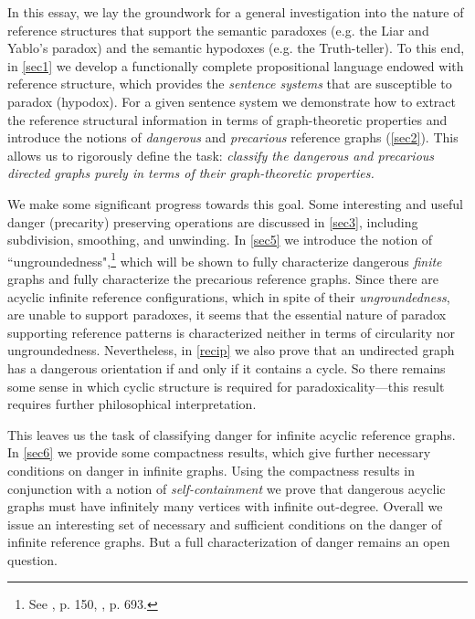 \documentclass[12pt]{kluwer}
\theoremstyle{remark}
\newcommand{\prg}{\hspace{0.25in}}
\begin{document}
\prg In this essay, we lay the groundwork for a general investigation into the nature of reference structures that support the semantic paradoxes (e.g. the Liar and Yablo's paradox) and the semantic hypodoxes (e.g. the Truth-teller). To this end, in \autoref{sec1} we develop a functionally complete propositional language endowed with reference structure, which provides the \textit{sentence systems} that are susceptible to paradox (hypodox). For a given sentence system we demonstrate how to extract the reference structural information in terms of graph-theoretic properties and introduce the notions of \textit{dangerous} and  \textit{precarious} reference graphs (\autoref{sec2}). This allows us to rigorously define the task: \textit{classify the dangerous and precarious directed graphs purely in terms of their graph-theoretic properties.} 

\prg We make some significant progress towards this goal. Some interesting and useful danger (precarity) preserving operations are discussed in \autoref{sec3}, including subdivision, smoothing, and unwinding. In \autoref{sec5} we introduce the notion of  ``ungroundedness",\footnote{See \cite{herzberger1970}, p. 150, \cite{kripke75}, p. 693.}  which will be shown to fully characterize dangerous \textit{finite} graphs and fully characterize the precarious reference graphs. Since there are acyclic infinite reference configurations, which in spite of their \textit{ungroundedness}, are unable to support paradoxes, it seems that the essential nature of paradox supporting reference patterns is characterized neither in terms of circularity nor ungroundedness. Nevertheless, in \autoref{recip} we also prove that an undirected graph has a dangerous orientation if and only if it contains a cycle. So there remains some sense in which cyclic structure is required for paradoxicality---this result requires further philosophical interpretation.

\prg This leaves us the task of classifying danger for infinite acyclic reference graphs. In \autoref{sec6} we provide some compactness results, which give further necessary conditions on danger in infinite graphs. Using the compactness results in conjunction with a notion of \textit{self-containment} we prove that dangerous acyclic graphs must have infinitely many vertices with infinite out-degree. Overall we issue an interesting set of necessary and sufficient conditions on the danger of infinite reference graphs. But a full characterization of danger remains an open question. 
\end{document}
